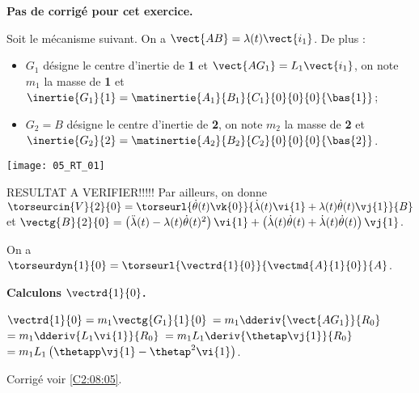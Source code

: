 \normaltrue
\correctionfalse


\setcounter{numques}{0}
\ifcorrection
\else
\textbf{Pas de corrigé pour cet exercice.}
\fi

\ifprof
\else
Soit le mécanisme suivant. On a $\vect{AB}=\lambda(t)\vect{i_1}$. De plus :
\begin{itemize}
\item $G_1$ désigne le centre d'inertie de \textbf{1} et $\vect{AG_1}=L_1\vect{i_1}$, on note $m_1$ la masse de \textbf{1} et $\inertie{G_1}{1}=\matinertie{A_1}{B_1}{C_1}{0}{0}{0}{\bas{1}}$; 
\item $G_2=B$ désigne le centre d'inertie de \textbf{2}, on note $m_2$ la masse de \textbf{2} et $\inertie{G_2}{2}=\matinertie{A_2}{B_2}{C_2}{0}{0}{0}{\bas{2}}$.
\end{itemize}
\begin{center}
\texttt{[image: 05\_RT\_01]}
\end{center}

\ifcolle
\else
RESULTAT A VERIFIER!!!!!
Par ailleurs, on donne $\torseurcin{V}{2}{0} =\torseurl{\dot{\theta}(t)\vk{0}}{\dot{\lambda}(t)\vi{1}+\lambda(t)\dot{\theta}(t)\vj{1}}{B}$ et $\vectg{B}{2}{0} =  \left( \ddot{\lambda}(t)-\lambda(t)\dot{\theta}(t)^2\right)\vi{1}  +  \left( \dot{\lambda}(t)\dot{\theta}(t) +\dot{\lambda}(t)\dot{\theta}(t)\right) \vj{1}$.
\fi

\fi




\ifprof
On a $\torseurdyn{1}{0} = \torseurl{\vectrd{1}{0}}{\vectmd{A}{1}{0}}{A}$.

\textbf{Calculons $\vectrd{1}{0}$.}

$\vectrd{1}{0} = m_1 \vectg{G_1}{1}{0}$ $=m_1\dderiv{\vect{AG_1}}{R_0}$
$=m_1\dderiv{L_1\vi{1}}{R_0}$
$=m_1L_1\deriv{\thetap\vj{1}}{R_0}$
$=m_1L_1\left( \thetapp \vj{1} - \thetap^2 \vi{1} \right)$.

\else
\fi

\ifprof

\else
\fi

\ifcolle
{}

\else
\fi

\ifprof
\else
\begin{flushright}
\footnotesize{Corrigé  voir \ref{C2:08:05}.}
\end{flushright}%
\fi